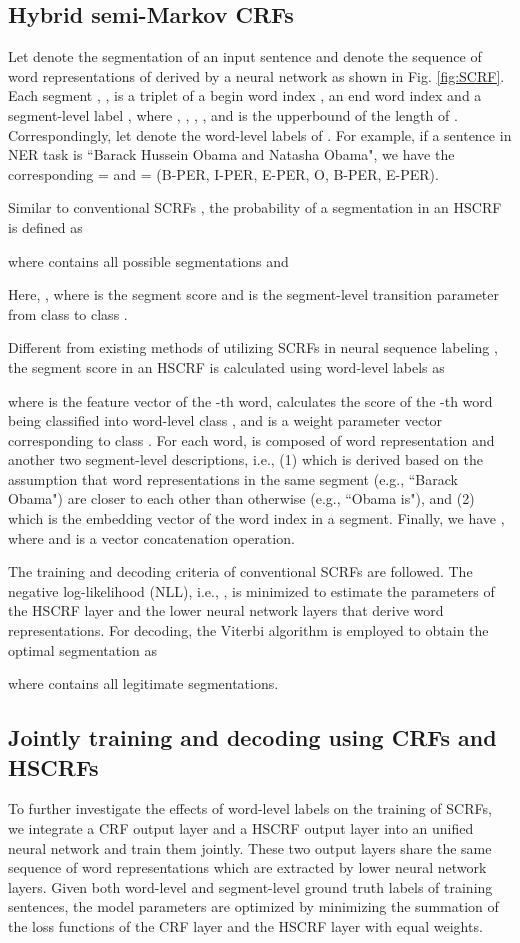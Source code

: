 \documentclass[11pt,a4paper]{article}
\begin{document}
\subsection{Hybrid semi-Markov CRFs}
Let  denote the segmentation of an input sentence 
and  denote the sequence of word representations of  derived by a neural network as shown in Fig. \ref{fig:SCRF}.
Each segment , , is a triplet of a begin word index , an end word index  and a segment-level label , where , , , , and  is the upperbound of the length of .
Correspondingly, let  denote the word-level labels of .
For example, if a sentence  in NER task is ``Barack Hussein Obama and Natasha Obama",
we have the corresponding  =  and  = (B-PER, I-PER, E-PER, O, B-PER, E-PER).

Similar to conventional SCRFs \cite{sarawagi2005semi}, the probability of a segmentation  in an HSCRF is defined as

where  contains all possible segmentations and

Here, ,
where  is the segment score and   is the segment-level transition parameter from  class  to class .

Different from existing methods of utilizing SCRFs in neural sequence labeling \cite{zhuo2016segment, kong2015segmental} , the segment score in an HSCRF is calculated using word-level labels as

where  is the feature vector of the -th word,
 calculates the score of the -th word being classified into word-level class ,
and  is a weight parameter vector corresponding to class .
For each word,  is composed of word representation  and another two segment-level descriptions, i.e.,
(1)  which is derived based on the assumption that word representations in the same segment (e.g., ``Barack Obama") are closer to each other than otherwise (e.g., ``Obama is"),
and (2)  which is the embedding vector of the word index in a segment.
Finally, we have , where  and  is a vector concatenation operation.

The training and decoding criteria of conventional SCRFs \cite{sarawagi2005semi} are followed.
The negative log-likelihood (NLL), i.e., , is minimized to estimate the parameters of the HSCRF layer and the lower neural network layers that derive word representations.
For decoding, the Viterbi algorithm is employed to obtain the optimal segmentation as

where  contains all legitimate segmentations.

\subsection{Jointly training and decoding using CRFs and HSCRFs}
To further investigate the effects of word-level labels on the training of SCRFs,
we integrate a CRF output layer and a HSCRF output layer into an unified neural network and train them jointly.
These two output layers share the same sequence of word representations  which are extracted by lower neural network layers.
Given both word-level and segment-level ground truth labels of training sentences,
the model parameters are optimized by minimizing the summation of the loss functions of the CRF layer and the HSCRF layer  with equal weights.
\end{document}
